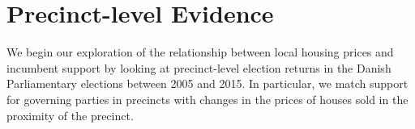 \documentclass[12pt,a4paper]{article}
\begin{document}





\section{Precinct-level Evidence}
We begin our exploration of the relationship between local housing prices and incumbent support by looking at precinct-level election returns in the Danish Parliamentary elections between 2005 and 2015. In particular, we match support for governing parties in precincts with changes in the prices of houses sold in the proximity of the precinct. 
\end{document}
